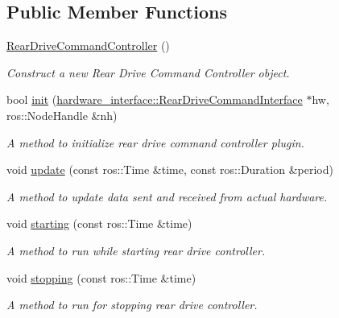 \subsection*{Public Member Functions}
\begin{DoxyCompactItemize}
\item 
\mbox{\label{classrear__drive__command__controller_1_1RearDriveCommandController_a9d9a2a13635c71d6831928bac5aa86a4}} 
\hyperlink{classrear__drive__command__controller_1_1RearDriveCommandController_a9d9a2a13635c71d6831928bac5aa86a4}{Rear\+Drive\+Command\+Controller} ()
\begin{DoxyCompactList}\small\item\em Construct a new Rear Drive Command Controller object. \end{DoxyCompactList}\item 
bool \hyperlink{classrear__drive__command__controller_1_1RearDriveCommandController_a655e9644e532ce282722c4fc4119ca30}{init} (\hyperlink{classhardware__interface_1_1RearDriveCommandInterface}{hardware\+\_\+interface\+::\+Rear\+Drive\+Command\+Interface} $\ast$hw, ros\+::\+Node\+Handle \&nh)
\begin{DoxyCompactList}\small\item\em A method to initialize rear drive command controller plugin. \end{DoxyCompactList}\item 
void \hyperlink{classrear__drive__command__controller_1_1RearDriveCommandController_a5d053e308f6a832679336d4291970e4b}{update} (const ros\+::\+Time \&time, const ros\+::\+Duration \&period)
\begin{DoxyCompactList}\small\item\em A method to update data sent and received from actual hardware. \end{DoxyCompactList}\item 
void \hyperlink{classrear__drive__command__controller_1_1RearDriveCommandController_af42682e69c11dc8fe209e97a1eab98aa}{starting} (const ros\+::\+Time \&time)
\begin{DoxyCompactList}\small\item\em A method to run while starting rear drive controller. \end{DoxyCompactList}\item 
void \hyperlink{classrear__drive__command__controller_1_1RearDriveCommandController_ae649504221c9a54aa7d3da4ef7a2e1dc}{stopping} (const ros\+::\+Time \&time)
\begin{DoxyCompactList}\small\item\em A method to run for stopping rear drive controller. \end{DoxyCompactList}\end{DoxyCompactItemize}


